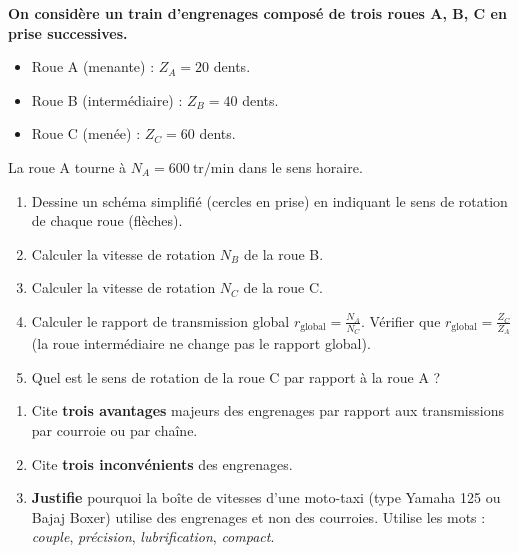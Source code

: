 \documentclass[11pt]{article}
\newcounter{popsec}
\newcounter{popsub}
\newcommand{\courssub}[1]{%
  \stepcounter{popsub}%
  \par\vspace{9pt}\noindent{\popxbold\fontsize{11.5}{13}\selectfont\color{popink}{\color{poporange}\thepopsec.\thepopsub}\hspace{6pt}#1}\par\nopagebreak\vspace{4pt}
}
\begin{document}
\begin{exercice}
\textbf{On considère un train d'engrenages composé de trois roues A, B, C en prise successives.}
\begin{itemize}
    \item Roue A (menante) : $Z_A = 20$ dents.
    \item Roue B (intermédiaire) : $Z_B = 40$ dents.
    \item Roue C (menée) : $Z_C = 60$ dents.
\end{itemize}
La roue A tourne à $N_A = 600\ \text{tr/min}$ dans le sens horaire.
\begin{enumerate}
    \item Dessine un schéma simplifié (cercles en prise) en indiquant le sens de rotation de chaque roue (flèches).
    \item Calculer la vitesse de rotation $N_B$ de la roue B.
    \item Calculer la vitesse de rotation $N_C$ de la roue C.
    \item Calculer le rapport de transmission global $r_{\text{global}} = \frac{N_A}{N_C}$. Vérifier que $r_{\text{global}} = \frac{Z_C}{Z_A}$ (la roue intermédiaire ne change pas le rapport global).
    \item Quel est le sens de rotation de la roue C par rapport à la roue A ?
\end{enumerate}
\end{exercice}

\begin{exercice}
\begin{enumerate}
    \item Cite \textbf{trois avantages} majeurs des engrenages par rapport aux transmissions par courroie ou par chaîne.
    \item Cite \textbf{trois inconvénients} des engrenages.
    \item \textbf{Justifie} pourquoi la boîte de vitesses d'une moto-taxi (type Yamaha 125 ou Bajaj Boxer) utilise des engrenages et non des courroies. Utilise les mots : \emph{couple}, \emph{précision}, \emph{lubrification}, \emph{compact}.
\end{enumerate}
\end{exercice}

\courssub{Je me prépare au Bac}
\end{document}
